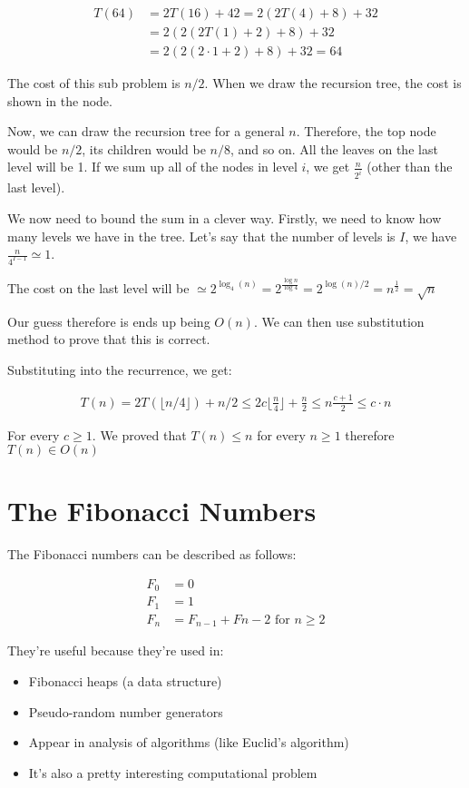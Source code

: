 \documentclass[11pt,a4paper,titlepage,dvipsnames,cmyk]{scrartcl}
\begin{document}
\begin{align*}
    T(64) &= 2T(16) + 42 = 2(2T(4)+8)+32 \\
    &= 2(2(2T(1)+2)+8) + 32 \\
    &= 2(2(2\cdot 1 + 2) + 8) + 32 = 64
\end{align*}

The cost of this sub problem is $n/2$. When we draw the recursion tree,
the cost is shown in the node.

Now, we can draw the recursion tree for a general $n$. Therefore, the top
node would be $n/2$, its children would be $n/8$, and so on. All the
leaves on the last level will be 1. If we sum up all of the nodes in level
$i$, we get $\frac{n}{2^i}$ (other than the last level).

We now need to bound the sum in a clever way. Firstly, we need to know how
many levels we have in the tree. Let's say that the number of levels is
$I$, we have $\frac{n}{4^{I-1}} \simeq 1$.

The cost on the last level will be $\simeq 2^{\log _4 (n)} = 2^{\frac{\log
n}{\log 4}} = 2^{\log(n)/2} = n^{\frac{1}{2}} = \sqrt{n}$

Our guess therefore is ends up being $O(n)$. We can then use substitution
method to prove that this is correct.

Substituting into the recurrence, we get:

\begin{align*}
    T(n) = 2T(\lfloor n/4 \rfloor) + n/2 \le 2c \lfloor
    \frac{n}{4} \rfloor+\frac{n}{2} \le n \frac{c+1}{2} \le c \cdot n
\end{align*}

For every $c \ge 1$. We proved that $T(n) \le n$ for every $n \ge 1$
therefore $T(n) \in O(n)$

\section{The Fibonacci Numbers}%
\label{sec:The Fibonacci Numbers}
The Fibonacci numbers can be described as follows:

\begin{align*}
    F_0 &= 0 \\
    F_1 &= 1 \\
    F_n &= F_{n-1} + F{n-2} \text{ for } n \ge 2
\end{align*}

They're useful because they're used in:

\begin{itemize}
    \item Fibonacci heaps (a data structure)
    \item Pseudo-random number generators
    \item Appear in analysis of algorithms (like Euclid's algorithm)
    \item It's also a pretty interesting computational problem
\end{itemize}
\end{document}
